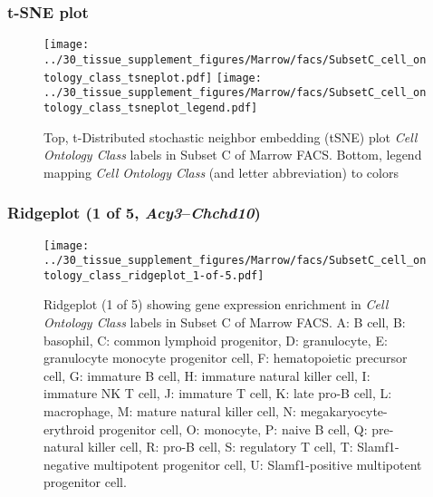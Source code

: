 \clearpage
\subsubsection{t-SNE plot}
\begin{figure}[h]
\centering
\texttt{[image: ../30\_tissue\_supplement\_figures/Marrow/facs/SubsetC\_cell\_ontology\_class\_tsneplot.pdf]}
\texttt{[image: ../30\_tissue\_supplement\_figures/Marrow/facs/SubsetC\_cell\_ontology\_class\_tsneplot\_legend.pdf]}
\caption{Top, t-Distributed stochastic neighbor embedding (tSNE) plot  \emph{Cell Ontology Class} labels in Subset C of Marrow FACS. Bottom, legend mapping \emph{Cell Ontology Class} (and letter abbreviation) to colors}
\end{figure}


\clearpage

\subsubsection{Ridgeplot (1 of 5, \emph{Acy3}--\emph{Chchd10})}
\begin{figure}[h]
\centering
\texttt{[image: ../30\_tissue\_supplement\_figures/Marrow/facs/SubsetC\_cell\_ontology\_class\_ridgeplot\_1-of-5.pdf]}

\caption{ Ridgeplot (1 of 5)  showing gene expression enrichment in \emph{Cell Ontology Class} labels in Subset C of Marrow FACS. A: B cell, B: basophil, C: common lymphoid progenitor, D: granulocyte, E: granulocyte monocyte progenitor cell, F: hematopoietic precursor cell, G: immature B cell, H: immature natural killer cell, I: immature NK T cell, J: immature T cell, K: late pro-B cell, L: macrophage, M: mature natural killer cell, N: megakaryocyte-erythroid progenitor cell, O: monocyte, P: naive B cell, Q: pre-natural killer cell, R: pro-B cell, S: regulatory T cell, T: Slamf1-negative multipotent progenitor cell, U: Slamf1-positive multipotent progenitor cell.}
\end{figure}


\clearpage

